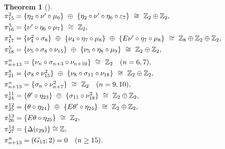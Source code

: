 \documentclass[10pt, leqno]{ltjsarticle}
\makeatletter
\newenvironment{Thleft}[1][]{%
  \begin{theorem}[#1]\mbox{}\\[0ex]\begingroup
  \setlength{\arraycolsep}{0pt}%
  \renewcommand{\arraystretch}{1.0}%
  \noindent$\begin{array}{@{}l@{}}%
}{%
  \end{array}$\par\endgroup\end{theorem}%
}
\newcommand{\gen}[1]{\{#1\}}       %
\newcommand{\pit}[2]{\pi_{#1}^{#2}}
\numberwithin{equation}{section}
\theoremstyle{plain}
\newtheorem{theorem}{Theorem}[section]
\theoremstyle{definition}
\theoremstyle{remark}
\makeatother
\begin{document}
\begin{paracol}{2}
\begin{Thleft}[]
\pit{15}{2}
 = \gen{\eta_2\circ\nu'\circ\mu_6}\ \oplus\ 
   \gen{\eta_2\circ\nu'\circ\eta_6\circ\varepsilon_7}
 \ \cong\ \mathbb{Z}_2\oplus\mathbb{Z}_2,\\[4pt]
\pit{16}{3}
 = \gen{\nu'\circ\eta_6\circ\mu_7}
 \ \cong\ \mathbb{Z}_2,\\[4pt]
\pit{17}{4}
 = \gen{\nu_4^2\circ\sigma_8}\ \oplus\
   \gen{\nu_4\circ\eta_7\circ\mu_8}\ \oplus\
   \gen{E\nu'\circ\eta_7\circ\mu_8}
 \ \cong\ \mathbb{Z}_8\oplus\mathbb{Z}_2\oplus\mathbb{Z}_2,\\[4pt]
\pit{18}{5}
 = \gen{\nu_5\circ\sigma_8\circ\nu_{15}}\ \oplus\
   \gen{\nu_5\circ\eta_8\circ\mu_9}
 \ \cong\ \mathbb{Z}_2\oplus\mathbb{Z}_2,\\[6pt]
\pit{n+13}{n}
 = \gen{\nu_n\circ\sigma_{n+3}\circ\nu_{n+10}}
 \ \cong\ \mathbb{Z}_2\quad (n=6,7),\\[4pt]
\pit{21}{8}
 = \gen{\sigma_8\circ\nu_{15}^2}\ \oplus\
   \gen{\nu_8\circ\sigma_{11}\circ\nu_{18}}
 \ \cong\ \mathbb{Z}_2\oplus\mathbb{Z}_2,\\[4pt]
\pit{n+13}{n}
 = \gen{\sigma_n\circ\nu_{n+7}^2}
 \ \cong\ \mathbb{Z}_2\quad (n=9,10),\\[4pt]
\pit{24}{11}
 = \gen{\theta'\circ\eta_{23}}\ \oplus\ \gen{\sigma_{11}\circ\nu_{18}^{2}}
 \ \cong\ \mathbb{Z}_2\oplus\mathbb{Z}_2,\\[4pt]
\pit{25}{12}
 = \gen{\theta\circ\eta_{24}}\ \oplus\ \gen{E\theta'\circ\eta_{24}}
 \ \cong\ \mathbb{Z}_2\oplus\mathbb{Z}_2,\\[4pt]
\pit{26}{13}
 = \gen{E\theta\circ\eta_{25}}
 \ \cong\ \mathbb{Z}_2,\\[4pt]
\pit{27}{14}=\gen{\Delta(\iota_{29})}\cong\mathbb{Z},\\[4pt]
\pit{n+13}{n}=(G_{13};2)=0\quad (n\ge15).
\end{Thleft}

\switchcolumn

\end{paracol}

\newpage
\end{document}
